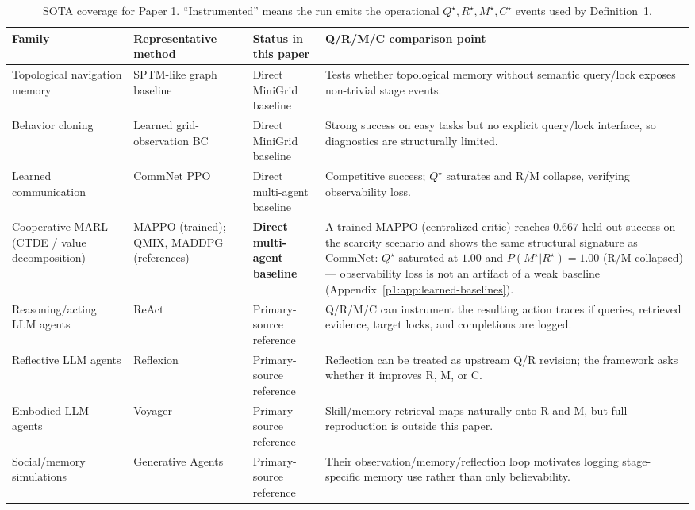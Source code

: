 \documentclass{article}
\begin{document}
\begin{table}[h]
\caption{SOTA coverage for Paper 1. ``Instrumented'' means the run emits the operational $Q^\star,R^\star,M^\star,C^\star$ events used by Definition~1.}
\label{p1:tab:sota-coverage}
\centering
\small
\begin{tabular}{p{2.45cm}p{2.55cm}p{2.7cm}p{4.0cm}}
\toprule
Family & Representative method & Status in this paper & Q/R/M/C comparison point \\
\midrule
Topological navigation memory & SPTM-like graph baseline \citep{savinov2018semi} & Direct MiniGrid baseline & Tests whether topological memory without semantic query/lock exposes non-trivial stage events. \\
Behavior cloning & Learned grid-observation BC & Direct MiniGrid baseline & Strong success on easy tasks but no explicit query/lock interface, so diagnostics are structurally limited. \\
Learned communication & CommNet PPO \citep{sukhbaatar2016commnet,schulman2017proximal} & Direct multi-agent baseline & Competitive success; $Q^\star$ saturates and R/M collapse, verifying observability loss. \\
Cooperative MARL (CTDE / value decomposition) & MAPPO \citep{yu2022mappo} (trained); QMIX, MADDPG \citep{rashid2018qmix,lowe2017maddpg} (references) & \textbf{Direct multi-agent baseline} & A trained MAPPO (centralized critic) reaches $0.667$ held-out success on the scarcity scenario and shows the same structural signature as CommNet: $Q^\star$ saturated at $1.00$ and $P(M^\star|R^\star){=}1.00$ (R/M collapsed) --- observability loss is not an artifact of a weak baseline (Appendix~\ref{p1:app:learned-baselines}). \\
Reasoning/acting LLM agents & ReAct \citep{yao2022react} & Primary-source reference & Q/R/M/C can instrument the resulting action traces if queries, retrieved evidence, target locks, and completions are logged. \\
Reflective LLM agents & Reflexion \citep{shinn2023reflexion} & Primary-source reference & Reflection can be treated as upstream Q/R revision; the framework asks whether it improves R, M, or C. \\
Embodied LLM agents & Voyager \citep{wang2023voyager} & Primary-source reference & Skill/memory retrieval maps naturally onto R and M, but full reproduction is outside this paper. \\
Social/memory simulations & Generative Agents \citep{park2023generative} & Primary-source reference & Their observation/memory/reflection loop motivates logging stage-specific memory use rather than only believability. \\

\end{tabular}
\end{table}
\end{document}
